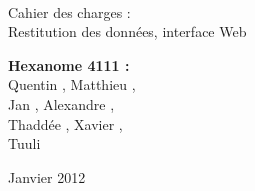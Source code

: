 \documentclass[a4paper]{article}
\begin{document}
\begin{titlepage}
~ 
\vfill
	\begin{center}
		\begin{Huge}
		Cahier des charges :\\ Restitution des données, interface Web
		\end{Huge} 
\vfill
		\textbf{Hexanome 4111 :} 
		\\Quentin {}, Matthieu , 
		\\Jan {}, Alexandre , 
		\\Thaddée , Xavier ,
		\\Tuuli {}\\
\vfill		
		\begin{Large}
		Janvier 2012
		\end{Large}
\vfill
	\begin{tabular}{|c|c|c|c|}
 	 \hline
	\end{tabular}
	\end{center}
\vfill
\end{titlepage}
\newpage
\tableofcontents
\newpage




\end{document}
